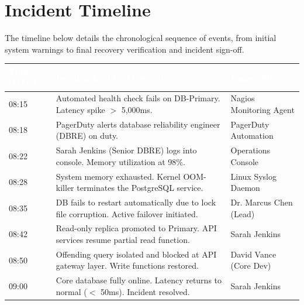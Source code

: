 \section{Incident Timeline}
The timeline below details the chronological sequence of events, from initial system warnings to final recovery verification and incident sign-off.

\begin{tabularx}{\textwidth}{>{\raggedright\arraybackslash\small}p{2.2cm} X >{\raggedright\arraybackslash\small}p{3.2cm}}
  \hline
  \rowcolor{PrimaryColor}
  \textcolor{white}{\textbf{Time (UTC)}} & \textcolor{white}{\textbf{Incident Event / Observation}} & \textcolor{white}{\textbf{Logged By}} \\
  \hline
  08:15 & Automated health check fails on DB-Primary. Latency spike $>$ 5,000ms. & Nagios Monitoring Agent \\
  \rowcolor{LightNeutral}
  08:18 & PagerDuty alerts database reliability engineer (DBRE) on duty. & PagerDuty Automation \\
  08:22 & Sarah Jenkins (Senior DBRE) logs into console. Memory utilization at 98\%. & Operations Console \\
  \rowcolor{LightNeutral}
  08:28 & System memory exhausted. Kernel OOM-killer terminates the PostgreSQL service. & Linux Syslog Daemon \\
  08:35 & DB fails to restart automatically due to lock file corruption. Active failover initiated. & Dr. Marcus Chen (Lead) \\
  \rowcolor{LightNeutral}
  08:42 & Read-only replica promoted to Primary. API services resume partial read function. & Sarah Jenkins \\
  08:50 & Offending query isolated and blocked at API gateway layer. Write functions restored. & David Vance (Core Dev) \\
  \rowcolor{LightNeutral}
  09:00 & Core database fully online. Latency returns to normal ($<$ 50ms). Incident resolved. & Sarah Jenkins \\
  \hline
\end{tabularx}

\newpage

